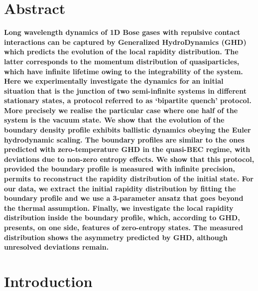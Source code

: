 \section*{Abstract}
{\bf
Long wavelength dynamics of 1D Bose gases with repulsive contact interactions can be captured by Generalized HydroDynamics (GHD) which predicts the evolution of the local rapidity distribution. The latter corresponds to the momentum distribution of quasiparticles, which have infinite lifetime owing to the integrability of the 
system.
 Here we experimentally investigate the dynamics for an  initial situation that is the junction of two 
semi-infinite systems in different stationary states, a protocol referred to as `bipartite quench' protocol.
More precisely  we realise the particular case where one half 
of the system is the vacuum state. 
 We show that the evolution of the boundary density profile exhibits ballistic dynamics obeying the Euler hydrodynamic scaling. The boundary profiles are similar to the ones predicted with zero-temperature GHD in the quasi-BEC regime, with deviations due to non-zero entropy effects. 
 We show that  this protocol, provided the boundary profile is measured with infinite precision, permits to reconstruct the rapidity distribution of the initial state. 
 For our data, we extract the initial rapidity distribution by fitting the boundary profile and we use 
 a 3-parameter ansatz that goes beyond the thermal assumption. 
Finally, we investigate the local rapidity distribution inside the boundary profile, which, according to GHD, presents, on one side, features of  zero-entropy states. The measured distribution shows the asymmetry predicted by GHD, although unresolved deviations  remain. 
}



\section{Introduction} 
\label{sec:intro}

